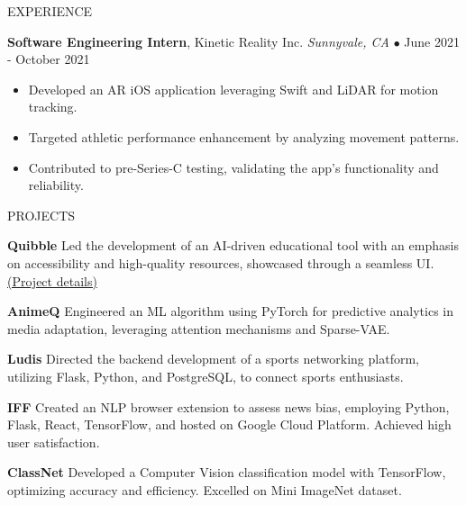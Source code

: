 \documentclass{resume} %
\begin{document}
\begin{rSection}{EXPERIENCE}
\vspace{-1mm}

\textbf{Software Engineering Intern}, Kinetic Reality Inc. \hfill \textit{Sunnyvale, CA} $\bullet$ June 2021 - October 2021
\vspace{-2mm}
\begin{itemize}
\itemsep -6pt {}
\item Developed an AR iOS application leveraging Swift and LiDAR for motion tracking.\n
    \item Targeted athletic performance enhancement by analyzing movement patterns.\n
    \item Contributed to pre-Series-C testing, validating the app’s functionality and reliability.\n\end{itemize}

\end{rSection}




\begin{rSection}{PROJECTS}
\vspace{-1em}

\item \textbf{Quibble} {Led the development of an AI-driven educational tool with an emphasis on accessibility and high-quality resources, showcased through a seamless UI.} \href{https://quibble.webflow.io/}{(Project details)}
\vspace{-1.75mm}

\item \textbf{AnimeQ} {Engineered an ML algorithm using PyTorch for predictive analytics in media adaptation, leveraging attention mechanisms and Sparse-VAE.}
\vspace{-1.75mm}

\item \textbf{Ludis} {Directed the backend development of a sports networking platform, utilizing Flask, Python, and PostgreSQL, to connect sports enthusiasts.}
\vspace{-1.75mm}

\item \textbf{IFF} {Created an NLP browser extension to assess news bias, employing Python, Flask, React, TensorFlow, and hosted on Google Cloud Platform. Achieved high user satisfaction.}
\vspace{-1.75mm}

\item \textbf{ClassNet} {Developed a Computer Vision classification model with TensorFlow, optimizing accuracy and efficiency. Excelled on Mini ImageNet dataset.}
\end{rSection} 
\end{document}
